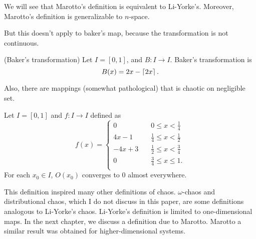 \documentclass[12pt,draft,twoside]{book}
\begin{document}
We will see that Marotto's definition is equivalent to Li-Yorke's.
Moreover, Marotto's definition is generalizable to $n$-space.

But this doesn't apply to baker's map, because the transformation is not continuous.
\begin{definition}
  (Baker's transformation)
  Let $I = [0,1]$, and $B: I \to I$. Baker's transformation is
  \begin{equation*}
    B(x) = 2x - \left \lceil 2x \right \rceil.
  \end{equation*}
\end{definition}

Also, there are mappings  (somewhat pathological) that is chaotic on negligible set.
\begin{proposition}
  Let $I = [0,1]$ and $f: I \to I$ defined as
  \begin{equation*}
    f(x) =
    \begin{cases}
      0 \quad & 0\leq x < \frac{1}{4} \\
      4x - 1 \quad  & \frac{1}{4} \leq x < \frac{1}{2} \\
      -4x + 3 \quad & \frac{1}{2} \leq x < \frac{3}{4} \\
      0 \quad & \frac{3}{4} \leq x \leq 1. \\
    \end{cases}
  \end{equation*}
  For each $x_0 \in I$, $O(x_0)$ converges to 0 almost everywhere.
\end{proposition}

This definition inspired many other definitions of chaos.
$\omega$-chaos and distributional chaos, which I do not discuss in this paper, are some definitions analogous to Li-Yorke's chaos.
Li-Yorke's definition is limited to one-dimensional maps.
In the next chapter, we discuss a definition due to Marotto.
Marotto a similar result was obtained for higher-dimensional systems.




\printindex
\end{document}
